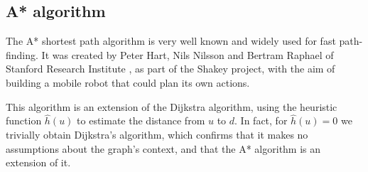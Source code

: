 \subsection{A* algorithm} \label{algorithm-shortestpath-astar}
The A* shortest path algorithm is very well known and widely used for fast path-finding. It was created by Peter Hart, Nils Nilsson and Bertram Raphael of Stanford Research Institute \cite{Astar}, as part of the Shakey project, with the aim of building a mobile robot that could plan its own actions.\par
This algorithm is an extension of the Dijkstra algorithm, using the heuristic function $\hat{h}(u)$ to estimate the distance from $u$ to $d$. In fact, for $\hat{h}(u) = 0$ we trivially obtain Dijkstra's algorithm, which confirms that it makes no assumptions about the graph's context, and that the A* algorithm is an extension of it.

